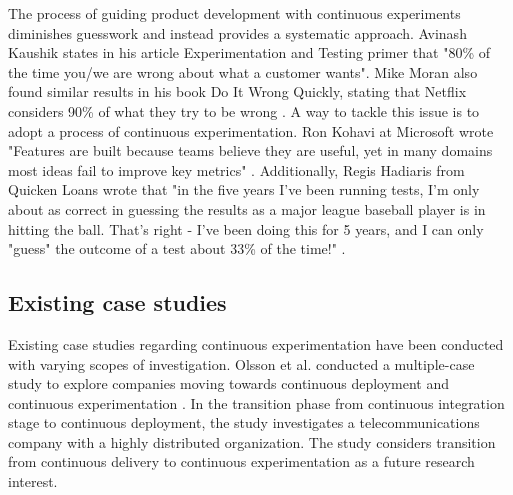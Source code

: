 \documentclass[english, grading]{tktltiki2}
\theoremstyle{definition}
\theoremstyle{remark}
\begin{document}
The process of guiding product development with continuous experiments diminishes guesswork and instead provides a systematic approach. Avinash Kaushik states in his article Experimentation and Testing primer \cite{kaushik} that "80\% of the time you/we are wrong about what a customer wants". Mike Moran also found similar results in his book Do It Wrong Quickly, stating that Netflix considers 90\% of what they try to be wrong \cite{moran2007wrong}. A way to tackle this issue is to adopt a process of continuous experimentation. Ron Kohavi at Microsoft wrote "Features are built because teams believe they are useful, yet in many domains most ideas fail to improve key metrics" \cite{kohavi2013online}. Additionally, Regis Hadiaris from Quicken Loans wrote that "in the five years I've been running tests, I'm only about as correct in guessing the results as a major league baseball player is in hitting the ball. That's right - I've been doing this for 5 years, and I can only "guess" the outcome of a test about 33\% of the time!" \cite{moranmultivariate}.


\subsection{Existing case studies}


Existing case studies regarding continuous experimentation have been conducted with varying scopes of investigation. Olsson et al. conducted a multiple-case study to explore companies moving towards continuous deployment and continuous experimentation \cite{olsson2012climbing}. In the transition phase from continuous integration stage to continuous deployment, the study investigates a telecommunications company with a highly distributed organization. The study considers transition from continuous delivery to continuous experimentation as a future research interest. 
\end{document}

